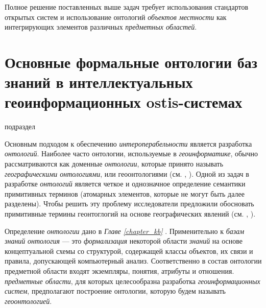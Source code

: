 Полное решение поставленных выше задач требует использования стандартов открытых систем и использование онтологий \textit{объектов местности} как интегрирующих элементов различных \textit{предметных областей}.

\section{Основные формальные онтологии баз знаний в интеллектуальных геоинформационных ostis-системах}
\label{chapter_gis_sec_components}

\begin{SCn}	
\begin{scnrelfromlist}{подраздел}
\end{scnrelfromlist}
\end{SCn}

Основным подходом к обеспечению \textit{интероперабельности} является разработка \textit{онтологий}. Наиболее часто онтологии, используемые в \textit{геоинформатике}, обычно рассматриваются как доменные \textit{онтологии}, которые принято называть \textit{географическими онтологиями}, или геоонтологиями (см. , ). Одной из задач в разработке \textit{онтологий} является четкое и однозначное определение семантики примитивных терминов (атомарных элементов, которые не могут быть далее разделены). Чтобы решить эту проблему исследователи предложили обосновать примитивные термины геонтоглогий на основе географических явлений (см. , ).

Определение \textit{онтологии} дано в \textit{Главе \ref{chapter_kb} }. Применительно к \textit{базам знаний} \textit{онтология} --- это \textit{формализация} некоторой области \textit{знаний} на основе концептуальной схемы со структурой, содержащей классы объектов, их связи и правила, допускающей компьютерный анализ. Соответственно в состав онтологии предметной области входят экземпляры, понятия, атрибуты и отношения.
\textit{предметные области}, для которых целесообразна разработка \textit{геоинформационных систем}, предполагают построение онтологии, которую будем называть \textit{геоонтологией}.


